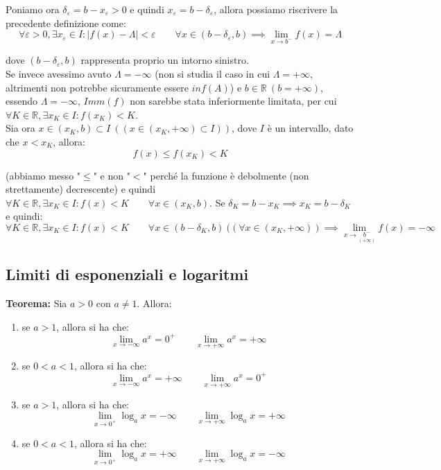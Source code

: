 \documentclass{article}
\begin{document}
\noindent Poniamo ora $\delta_\varepsilon = b - x_\varepsilon > 0$ e quindi $x_\varepsilon = b - \delta_\varepsilon$, allora possiamo riscrivere la precedente definizione come: 
\begin{equation*}
    \forall \varepsilon > 0, \exists x_\varepsilon \in I : |f(x) - \Lambda| < \varepsilon \qquad \forall x \in (b - \delta_\varepsilon, b) \implies \lim_{x \to b^-} f(x) = \Lambda
\end{equation*}

\noindent dove $(b - \delta_\varepsilon, b)$ rappresenta proprio un intorno sinistro.\\

\noindent Se invece avessimo avuto $\Lambda = -\infty$ (non si studia il caso in cui $\Lambda = +\infty$, altrimenti non potrebbe sicuramente essere $inf(A)$) e $b \in \mathbb{R} \ (b = +\infty)$, essendo $\Lambda = - \infty$, $Imm(f)$ non sarebbe stata inferiormente limitata, per cui $\forall K \in \mathbb{R}, \exists x_K \in I : f(x_K) < K$.\\
Sia ora $x \in (x_K, b) \subset I \ ((x \in (x_K, +\infty) \subset I))$, dove $I$ è un intervallo, dato che $x < x_K$, allora: 
\begin{equation*}
    f(x) \leq f(x_K) < K
\end{equation*}

\noindent (abbiamo messo "$\leq$" e non "$<$" perché la funzione è debolmente (non strettamente) decrescente) e quindi $\forall K \in \mathbb{R}, \exists x_K \in I : f(x) < K \qquad \forall x \in (x_K, b)$. Se $\delta_K = b - x_K \implies x_K = b - \delta_K$ e quindi: 
\begin{equation*}
    \forall K \in \mathbb{R}, \exists x_K \in I : f(x) < K \qquad \forall x \in (b - \delta_K, b) \ ((\forall x \in (x_K, +\infty)) \implies \lim_{x \to \underset{\scriptstyle (+\infty)}{b^-}} f(x) = -\infty
\end{equation*}

\subsection{Limiti di esponenziali e logaritmi}
\textbf{Teorema:} Sia $a > 0$ con $a \neq 1$. Allora:

\begin{enumerate}
    \item se $a > 1$, allora si ha che: $$\lim_{x \to - \infty} a^x = 0^+ \qquad \lim_{x \to +\infty} a^x = +\infty$$
    \item se $0 < a < 1$, allora si ha che: $$\lim_{x \to - \infty} a^x = +\infty \qquad \lim_{x \to +\infty} a^x = 0^+$$
    \item se $a > 1$, allora si ha che: $$\lim_{x \to 0^+} \log_ax = -\infty \qquad \lim_{x \to +\infty} \log_ax = + \infty$$
    \item se $0 < a < 1$, allora si ha che: $$\lim_{x \to 0^+} \log_ax = +\infty \qquad \lim_{x \to +\infty} \log_ax = -\infty$$
\end{enumerate}
\end{document}
